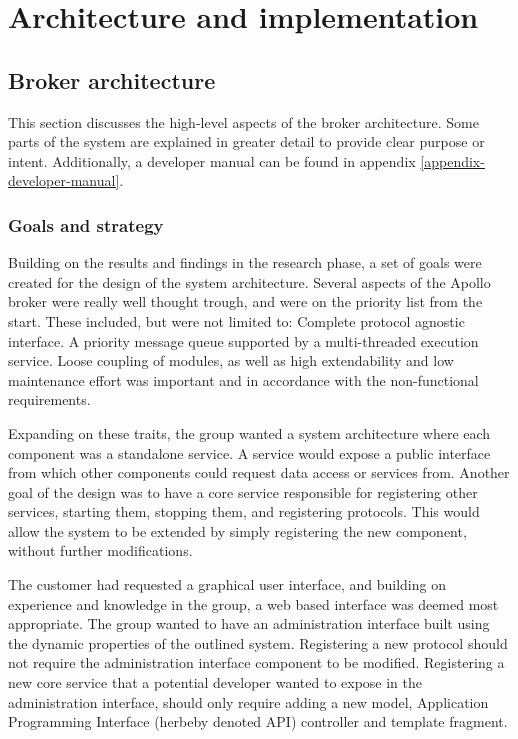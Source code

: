 
\chapter{Architecture and implementation}
\label{ch:architecture_and_implementation}

\section{Broker architecture}
\label{sec:architecture_and_implementation-broker_architecture}

This section discusses the high-level aspects of the broker architecture. Some parts of the system are explained in greater detail to provide clear purpose or intent. Additionally, a developer manual can be found in appendix \ref{appendix-developer-manual}.

\subsection{Goals and strategy}
\label{subsec:architecture_and_implementation-broker_architecture-goals_and_strategy}

Building on the results and findings in the research phase, a set of goals were created for the design of the system architecture. Several aspects of the Apollo broker were really well thought trough, and were on the priority list from the start. These included, but were not limited to: Complete protocol agnostic interface. A priority message queue supported by a multi-threaded execution service. Loose coupling of modules, as well as high extendability and low maintenance effort was important and in accordance with the non-functional requirements.

Expanding on these traits, the group wanted a system architecture where each component was a standalone service. A service would expose a public interface from which other components could request data access or services from. Another goal of the design was to have a core service responsible for registering other services, starting them, stopping them, and registering protocols. This would allow the system to be extended by simply registering the new component, without further modifications.

The customer had requested a graphical user interface, and building on experience and knowledge in the group, a web based interface was deemed most appropriate. The group wanted to have an administration interface built using the dynamic properties of the outlined system. Registering a new protocol should not require the administration interface component to be modified. Registering a new core service that a potential developer wanted to expose in the administration interface, should only require adding a new model, Application Programming Interface (herbeby denoted API) controller and template fragment.

